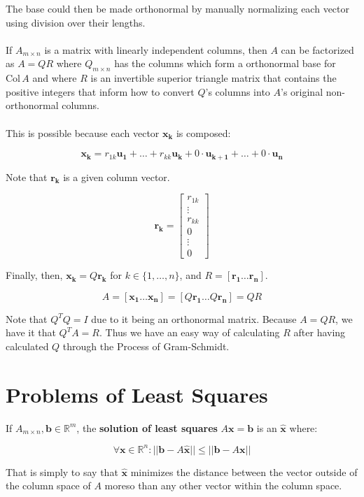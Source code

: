 \documentclass[12pt]{article}
\newcommand{\R}{\mathbb{R}}
\newcommand{\bt}[1]{\textbf{{#1}}}
\newcommand{\bm}[1]{\mathbf{{#1}}}
\newcommand{\mb}{\begin{bmatrix}}
\newcommand{\me}{\end{bmatrix}}
\newcommand{\set}[1]{\{{#1}\}}
\newcommand{\norm}[1]{||{#1}||}
\begin{document}
The base could then be made orthonormal by manually normalizing each vector using division over their lengths. \\ \\

If $A_{m \times n}$ is a matrix with linearly independent columns, then $A$ can be factorized as $A = QR$ where $Q_{m\times n}$ has the columns which
form a orthonormal base for $\textrm{Col}\,A$ and where $R$ is an invertible superior triangle matrix that contains
the positive integers that inform how to convert $Q$'s columns into $A$'s original non-orthonormal columns. \\ \\

This is possible because each vector $\bm{x_k}$ is composed:

$$\bm{x_k} = r_{1k}\bm{u_1} + \dots + r_{kk}\bm{u_k} + 0 \cdot \bm{u_{k + 1}} + \dots + 0 \cdot \bm{u_n}$$

Note that $\bm{r_k}$ is a given column vector.

$$\bm{r_k} = \mb r_{1k} \\ \vdots \\ r_{kk} \\ 0 \\ \vdots \\ 0 \me$$

Finally, then, $\bm{x_k} = Q\bm{r_k}$ for $k \in {\set{1,\dots,n}}$, and $R = [\bm{r_1}\dots\bm{r_n}]$.

$$A = [\bm{x_1\dots x_n}] = [Q\bm{r_1}\dots Q\bm{r_n}] = QR$$

Note that $Q^T Q = I$ due to it being an orthonormal matrix. Because $A = QR$, we
have it that $Q^T A = R$. Thus we have an easy way of calculating $R$ after
having calculated $Q$ through the Process of Gram-Schmidt.

\section*{Problems of Least Squares}

If $A_{m \times n}, \bm{b} \in \R^m$, the \bt{solution of least squares}
$A\bm{x = b}$ is an $\bm{\hat{x}}$ where:

$$\forall \bm{x} \in \R^n: \norm{\bm{b} - A\bm{\hat{x}}} \leq \norm{\bm{b} - A\bm{x}}$$

That is simply to say that $\bm{\hat{x}}$ minimizes the distance between
the vector outside of the column space of $A$ moreso than any other vector within the column space. \\ \\
\end{document}
